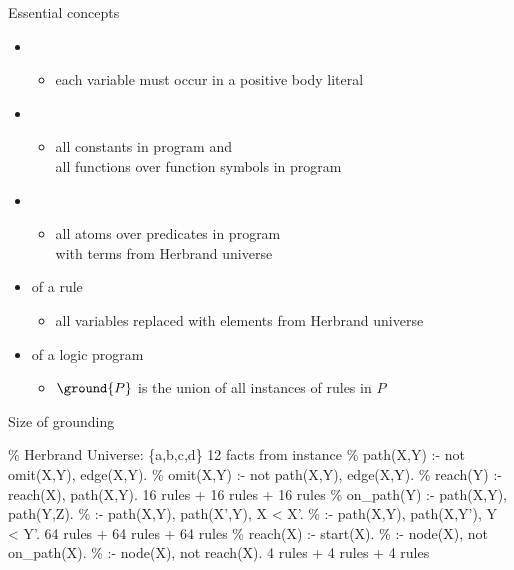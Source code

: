 \begin{frame}{Essential concepts}
  \begin{itemize}
    \item {}
      \begin{itemize}\normalsize
        \item each variable must occur in a positive body literal
      \end{itemize}
    \item {}
      \begin{itemize}\normalsize
        \item
          all constants in program and\\
          all functions over function symbols in program
      \end{itemize}
    \item {}
      \begin{itemize}\normalsize
        \item all atoms over predicates in program\\ with terms from Herbrand universe
      \end{itemize}
    \item {}  of a rule
      \begin{itemize}\normalsize
        \item all variables replaced with elements from Herbrand universe
      \end{itemize}
    \item {} of a logic program
      \begin{itemize}\normalsize
        \item \(\ground{P}\) is the union of all instances of %
              rules in \(P\)
      \end{itemize}
  \end{itemize}
\end{frame}
\begin{frame}[fragile]{Size of grounding}
  \begin{SemiVerbatim}{.9}
{\color{comment}\% Herbrand Universe: \{a,b,c,d\}}
12 facts from instance
{\color{comment}\% path(X,Y) :- not omit(X,Y), edge(X,Y).}
{\color{comment}\% omit(X,Y) :- not path(X,Y), edge(X,Y).}
{\color{comment}\% reach(Y) :- reach(X), path(X,Y).}
16 rules + 16 rules + 16 rules
{\color{comment}\% on_path(Y) :- path(X,Y), path(Y,Z).}
{\color{comment}\% :- path(X,Y), path(X',Y), X < X'.}
{\color{comment}\% :- path(X,Y), path(X,Y'), Y < Y'.}
64 rules + 64 rules + 64 rules
{\color{comment}\% reach(X) :- start(X).}
{\color{comment}\% :- node(X), not on_path(X).}
{\color{comment}\% :- node(X), not reach(X).}
4 rules + 4 rules + 4 rules
  \end{SemiVerbatim}
\end{frame}
